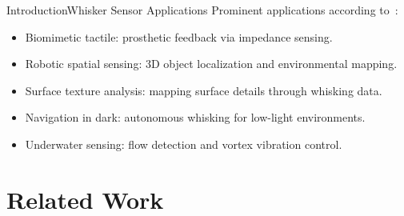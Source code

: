 \documentclass[AIRbeamer
,optEnglish
,optBiber
,optBibstyleAlphabetic
,optBeamerClassicFormat%
]{AIRlatex}
\begin{document}
    \begin{frame}{Introduction}{Whisker Sensor Applications}
        Prominent applications according to~\cite{s22072705}:
        \begin{itemize}
            \item Biomimetic tactile: prosthetic feedback via impedance sensing.
            \item Robotic spatial sensing: 3D object localization and environmental mapping.
            \item Surface texture analysis: mapping surface details through whisking data.
            \item Navigation in dark: autonomous whisking for low-light environments.
            \item Underwater sensing: flow detection and vortex vibration control.
        \end{itemize}
    \end{frame}


    \section{Related Work}
\end{document}
